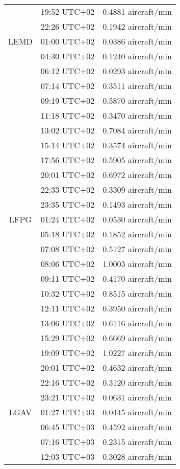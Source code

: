 \begin{tabular}{ccr}
     & 19:52 UTC+02 &  0.4881 aircraft/min \\
     & 22:26 UTC+02 &  0.1942 aircraft/min \\
LEMD & 01:00 UTC+02 &  0.0386 aircraft/min \\
     & 04:30 UTC+02 &  0.1240 aircraft/min \\
     & 06:12 UTC+02 &  0.0293 aircraft/min \\
     & 07:14 UTC+02 &  0.3511 aircraft/min \\
     & 09:19 UTC+02 &  0.5870 aircraft/min \\
     & 11:18 UTC+02 &  0.3470 aircraft/min \\
     & 13:02 UTC+02 &  0.7084 aircraft/min \\
     & 15:14 UTC+02 &  0.3574 aircraft/min \\
     & 17:56 UTC+02 &  0.5905 aircraft/min \\
     & 20:01 UTC+02 &  0.6972 aircraft/min \\
     & 22:33 UTC+02 &  0.3309 aircraft/min \\
     & 23:35 UTC+02 &  0.1493 aircraft/min \\
LFPG & 01:24 UTC+02 &  0.0530 aircraft/min \\
     & 05:18 UTC+02 &  0.1852 aircraft/min \\
     & 07:08 UTC+02 &  0.5127 aircraft/min \\
     & 08:06 UTC+02 &  1.0003 aircraft/min \\
     & 09:11 UTC+02 &  0.4170 aircraft/min \\
     & 10:32 UTC+02 &  0.8515 aircraft/min \\
     & 12:11 UTC+02 &  0.3950 aircraft/min \\
     & 13:06 UTC+02 &  0.6116 aircraft/min \\
     & 15:29 UTC+02 &  0.6669 aircraft/min \\
     & 19:09 UTC+02 &  1.0227 aircraft/min \\
     & 20:01 UTC+02 &  0.4632 aircraft/min \\
     & 22:16 UTC+02 &  0.3120 aircraft/min \\
     & 23:21 UTC+02 &  0.0631 aircraft/min \\
LGAV & 01:27 UTC+03 &  0.0445 aircraft/min \\
     & 06:45 UTC+03 &  0.4592 aircraft/min \\
     & 07:16 UTC+03 &  0.2315 aircraft/min \\
     & 12:03 UTC+03 &  0.3028 aircraft/min \\

\end{tabular}
